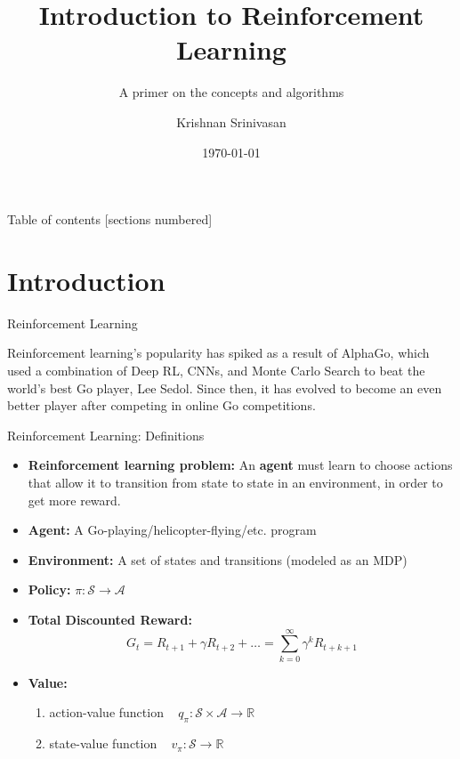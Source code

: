\documentclass[10pt]{beamer}
\title{Introduction to Reinforcement Learning}
\subtitle{A primer on the concepts and algorithms}
\date{\today}
\author{Krishnan Srinivasan}
\institute{Yale University}
\begin{document}
\maketitle

\begin{frame}{Table of contents}
  [sections numbered]
  \tableofcontents[hideallsubsections]
\end{frame}

\section{Introduction}

\begin{frame}{Reinforcement Learning}

  Reinforcement learning's popularity has spiked as a result of AlphaGo,
  which used a combination of Deep RL, CNNs, and Monte Carlo Search to
  beat the world's best Go player, Lee Sedol. Since then, it has evolved
  to become an even better player after competing in online Go competitions.

\end{frame}

\begin{frame}{Reinforcement Learning: Definitions}

  \begin{itemize}
    \item \textbf{Reinforcement learning problem:} An \textbf{agent} must learn to choose actions that allow it to transition from state to state in an environment, in order to get more reward.
    \item \textbf{Agent:} A Go-playing/helicopter-flying/etc. program
    \item \textbf{Environment:} A set of states and transitions (modeled as an MDP)
    \item \textbf{Policy:} $\pi: \mathcal{S} \rightarrow \mathcal{A}$
    \item \textbf{Total Discounted Reward:} $$G_t = R_{t+1} + \gamma R_{t+2} + \ldots = \sum_{k=0}^{\infty} \gamma^k R_{t+k+1}$$
    \item \textbf{Value:}
    \begin{enumerate}
      \item action-value function ~ $q_\pi: \mathcal{S} \times \mathcal{A}
        \rightarrow \mathbb{R}$
      \item state-value function ~ $v_\pi: \mathcal{S} \rightarrow \mathbb{R}$
    \end{enumerate}
  \end{itemize}

\end{frame}
\end{document}
